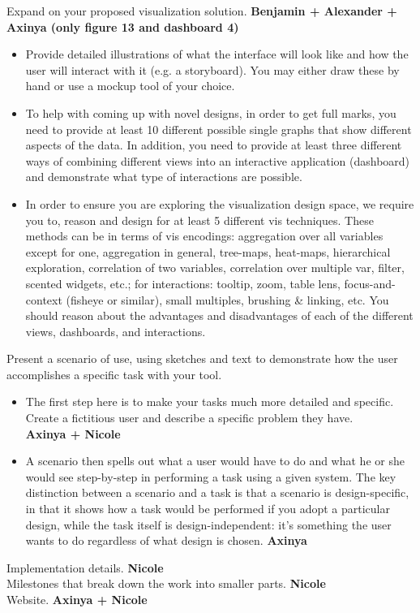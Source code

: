 \documentclass{article}
\begin{document}
 Expand on your proposed visualization solution. \textbf{Benjamin + Alexander + Axinya (only figure 13 and dashboard 4)}
\begin{itemize}

\item Provide detailed illustrations of what the interface will look like and how the user will interact with it (e.g. a storyboard). You may either draw these by hand or use a mockup tool of your choice.

\item To help with coming up with novel designs, in order to get full marks, you need to provide at least 10 different possible single graphs that show different aspects of the data. In addition, you need to provide at least three different ways of combining different views into an interactive application (dashboard) and demonstrate what type of interactions are possible.

\item In order to ensure you are exploring the visualization design space, we require you to, reason and design for at least 5 different vis techniques. These methods can be in terms of vis encodings: aggregation over all variables except for one, aggregation in general, tree-maps, heat-maps, hierarchical exploration, correlation of two variables, correlation over multiple var, filter, scented widgets, etc.; for interactions: tooltip, zoom, table lens, focus-and-context (fisheye or similar), small multiples, brushing \& linking, etc.
You should reason about the advantages and disadvantages of each of the different views, dashboards, and interactions. 
\end{itemize}
Present a scenario of use, using sketches and text to demonstrate how the user accomplishes a specific task with your tool. 
\begin{itemize}
\item The first step here is to make your tasks much more detailed and specific. Create a fictitious user and describe a specific problem they have. \\ \textbf{Axinya + Nicole}
\item A scenario then spells out what a user would have to do and what he or she would see step-by-step in performing a task using a given system. The key distinction between a scenario and a task is that a scenario is design-specific, in that it shows how a task would be performed if you adopt a particular design, while the task itself is design-independent: it's something the user wants to do regardless of what design is chosen. \textbf{Axinya}
\end{itemize}
  Implementation details. \textbf{Nicole} \\
  Milestones that break down the work into smaller parts. \textbf{Nicole}\\
 Website. \textbf{Axinya + Nicole}
\end{document}
